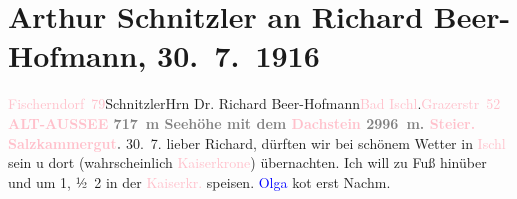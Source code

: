

               \section[Arthur Schnitzler an Richard Beer-Hofmann, 30. 7. 1916]{ Arthur Schnitzler an Richard Beer-Hofmann, 30. 7. 1916}\nopagebreak{}\rehead{ }\normalsize\beginnumbering{} \toendnotes[C]{\smallbreak\pagebreak[2]} 
\toendnotes[C]{\smallbreak}\pstart{}{\pb}\textcolor{pink}{Fischerndorf 79}{}\ledrightnote{\textcolor{pink}{Fischerndorf}}\pend{}\pstart{}Schnitzler\pend{}{\bigskip}\pstart{}Hrn Dr. Richard Beer-Hofmann\pend{}\pstart{}\textcolor{pink}{Bad Ischl}{}\ledrightnote{\textcolor{pink}{Bad Ischl}}.\pend{}\pstart{}\textcolor{pink}{Grazerstr 52}{}\ledrightnote{\textcolor{pink}{Grazer Straße}}\pend{}{\bigskip}\pstart
           \noindent{}\centering{}{\pb}\textcolor{gray}{\textbf{\textcolor{pink}{ALT-AUSSEE}{}\ledrightnote{\textcolor{pink}{Altaussee}} 717 m Seehöhe mit dem \textcolor{pink}{Dachstein}{}\ledrightnote{\textcolor{pink}{Dachstein}}
                     2996 m. \textcolor{pink}{Steier. Salzkammergut}{}\ledrightnote{\textcolor{pink}{Salzkammergut}}.}}\pend
           \pstart
           \raggedleft{}{\pb}30. 7.\pend
           \pstart
           lieber Richard, \label{KLL02235_Beer-Hofmann-1v}\label{KLL02235_Beer-Hofmann-1h} dürften wir bei schönem Wetter in \textcolor{pink}{Ischl}{}\ledrightnote{\textcolor{pink}{Bad Ischl}} sein
               u dort (wahrscheinlich \textcolor{pink}{Kaiserkrone}{}\ledrightnote{\textcolor{pink}{Hotel Kaiserkrone}}) übernachten. Ich
               will zu Fuß hinüber und um 1, ½ 2 in der \textcolor{pink}{Kaiserkr.}{}\ledrightnote{\textcolor{pink}{Hotel Kaiserkrone}} speisen. \textcolor{blue}{Olga}{}\ledrightnote{\textcolor{blue}{Olga Schnitzler}} ko{\geminationm}t erst Nachm.
